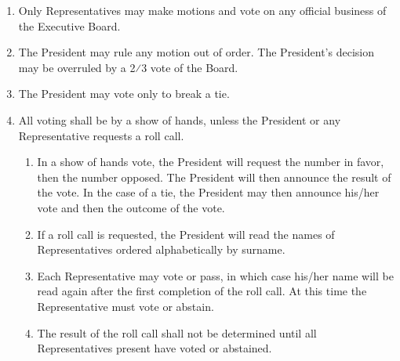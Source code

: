 
\begin{enumerate}
\item Only Representatives may make motions and vote on any official business of the Executive Board.
\item The President may rule any motion out of order. The President’s decision may be overruled by a 2⁄3 vote of the Board.
\item The President may vote only to break a tie.
\item All voting shall be by a show of hands, unless the President or any Representative requests a roll call.
\begin{enumerate}
\item In a show of hands vote, the President will request the number in favor, then the number opposed. The President will then announce the result of the vote. In the case of a tie, the President may then announce his/her vote and then the outcome of the vote.
\item If a roll call is requested, the President will read the names of Representatives ordered alphabetically by surname.
\item Each Representative may vote or pass, in which case his/her name will be read again after the first completion of the roll call. At this time the Representative must vote or abstain.
\item The result of the roll call shall not be determined until all Representatives present have voted or abstained.
\end{enumerate}
\end{enumerate}